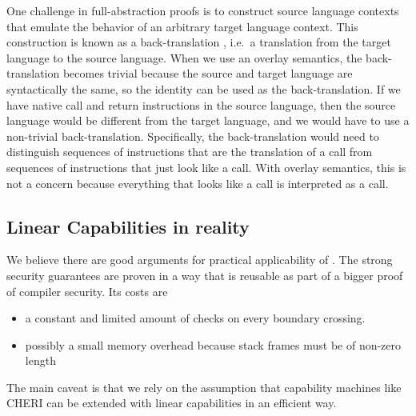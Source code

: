 \begin{jversion}
  One challenge in full-abstraction proofs is to construct source language contexts that emulate the behavior of an arbitrary target language context.
  This construction is known as a back-translation  \citep{devriese_modular_2017}, i.e.\ a translation from the target language to the source language.
  When we use an overlay semantics, the back-translation becomes trivial because the source and target language are syntactically the same, so the identity can be used as the back-translation.
  If we have native call and return instructions in the source language, then the source language would be different from the target language, and we would have to use a non-trivial back-translation.
  Specifically, the back-translation would need to distinguish sequences of instructions that are the translation of a call from sequences of instructions that just look like a call.
  With overlay semantics, this is not a concern because everything that looks like a call is interpreted as a call.
\end{jversion}

\subsection{Linear Capabilities in reality}
We believe there are good arguments for practical applicability of \stktokens{}.
The strong security guarantees are proven in a way that is reusable as part of a bigger proof of compiler security.
Its costs are
\begin{itemize}
\item a constant and limited amount of checks on every boundary crossing.
\item possibly a small memory overhead because stack frames must be of non-zero length
\end{itemize}
The main caveat is that we rely on the assumption that capability machines like CHERI can be extended with linear capabilities in an efficient way.

